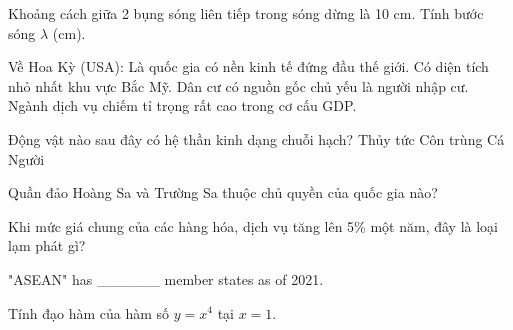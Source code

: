 \begin{ex}
    Khoảng cách giữa 2 bụng sóng liên tiếp trong sóng dừng là 10 cm. Tính bước sóng $\lambda$ (cm).
\end{ex}

\begin{ex}
    Về Hoa Kỳ (USA):
    \choiceTF
    {\True Là quốc gia có nền kinh tế đứng đầu thế giới.}
    {Có diện tích nhỏ nhất khu vực Bắc Mỹ.}
    {\True Dân cư có nguồn gốc chủ yếu là người nhập cư.}
    {\True Ngành dịch vụ chiếm tỉ trọng rất cao trong cơ cấu GDP.}
\end{ex}

\begin{ex}
    Động vật nào sau đây có hệ thần kinh dạng chuỗi hạch?
    \choice
    {Thủy tức}
    {\True Côn trùng}
    {Cá}
    {Người}
\end{ex}

\begin{ex}
    Quần đảo Hoàng Sa và Trường Sa thuộc chủ quyền của quốc gia nào?
\end{ex}

\begin{ex}
    Khi mức giá chung của các hàng hóa, dịch vụ tăng lên 5\% một năm, đây là loại lạm phát gì?
\end{ex}

\begin{ex}
    "ASEAN" has ______ member states as of 2021.
\end{ex}

\begin{ex}
    Tính đạo hàm của hàm số $y = x^4$ tại $x=1$.
\end{ex}

